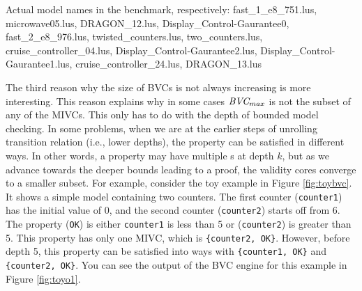 \begin{table}
\vspace{0.07in}
{\small{Actual model names in the benchmark, respectively: fast\_1\_e8\_751.lus, microwave05.lus, DRAGON\_12.lus, Display\_Control-Gaurantee0, fast\_2\_e8\_976.lus, twisted\_counters.lus, two\_counters.lus, cruise\_controller\_04.lus, Display\_Control-Gaurantee2.lus, Display\_Control-Gaurantee1.lus, cruise\_controller\_24.lus, DRAGON\_13.lus}}
  \label{tab:bvc-abnormal}
\end{table}

The third reason why the size of BVCs is not always increasing is more interesting.   This reason explains why in some cases $\textit{BVC} _{max}$ is not the subset of any of the MIVCs. This only has to do with the depth of bounded model checking. In some problems, when we are at the earlier steps of unrolling transition relation (i.e., lower depths), the property can be satisfied in different ways. In other words, a property may have multiple \bvc s at depth $k$, but as we advance towards the deeper bounds leading to a proof, the validity cores converge to a smaller subset. For example, consider the toy example in Figure \ref{fig:toybvc}. It shows a simple model containing two counters. The first counter ({\small{\texttt{counter1}}}) has the initial value of 0, and the second counter ({\small{\texttt{counter2}}}) starts off from 6. The property ({\small{\texttt{OK}}}) is either {\small{\texttt{counter1}}} is less than 5 or ({\small{\texttt{counter2}}}) is greater than 5. This property has only one MIVC, which is {\small{\texttt{\{counter2, OK\}}}}. However, before depth 5, this property can be satisfied into ways with {\small{\texttt{\{counter1, OK\}}}} and {\small{\texttt{\{counter2, OK\}}}}. You can see the output of the BVC engine for this example in Figure \ref{fig:toyo1}.

